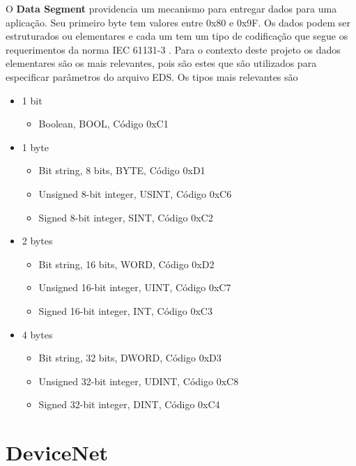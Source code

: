 O {\bf Data Segment} providencia um mecanismo para entregar dados para uma aplicação. Seu primeiro byte tem valores entre 0x80 e 0x9F. Os dados podem ser estruturados ou elementares e cada um tem um tipo de codificação que segue os requerimentos da norma IEC 61131-3 \cite{iec61158}. Para o contexto deste projeto os dados elementares são os mais relevantes, pois são estes que são utilizados para especificar parâmetros do arquivo EDS. Os tipos mais relevantes são

\begin{itemize}
\item 1 bit
\begin{itemize}
\item Boolean, BOOL, Código 0xC1
\end{itemize}
\item 1 byte
\begin{itemize}
\item Bit string, 8 bits, BYTE, Código 0xD1
\item Unsigned 8-bit integer, USINT, Código 0xC6
\item Signed 8-bit integer, SINT, Código 0xC2

\end{itemize}
\item 2 bytes
\begin{itemize}
\item Bit string, 16 bits, WORD, Código 0xD2
\item Unsigned 16-bit integer, UINT, Código 0xC7
\item Signed 16-bit integer, INT, Código 0xC3
\end{itemize}
\item 4 bytes
\begin{itemize}
\item Bit string, 32 bits, DWORD, Código 0xD3
\item Unsigned 32-bit integer, UDINT, Código 0xC8
\item Signed 32-bit integer, DINT, Código 0xC4
\end{itemize}
\end{itemize}
 
\section{DeviceNet}

\cite{mcp2515}